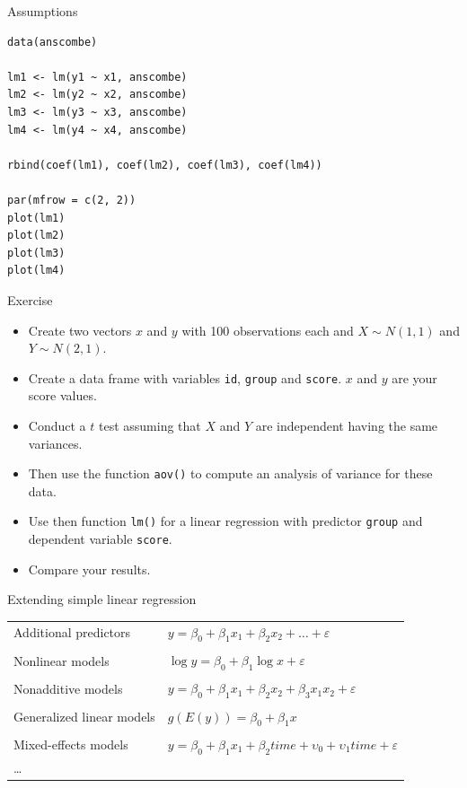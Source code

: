 \documentclass[aspectratio=169]{beamer}
\begin{document}
\begin{frame}[fragile]{Assumptions}
\begin{lstlisting}
data(anscombe)

lm1 <- lm(y1 ~ x1, anscombe)
lm2 <- lm(y2 ~ x2, anscombe)
lm3 <- lm(y3 ~ x3, anscombe)
lm4 <- lm(y4 ~ x4, anscombe)

rbind(coef(lm1), coef(lm2), coef(lm3), coef(lm4))

par(mfrow = c(2, 2))
plot(lm1)
plot(lm2)
plot(lm3)
plot(lm4)
\end{lstlisting}
\end{frame}

\begin{frame}{}
  \begin{block}{Exercise}
    \begin{itemize}
      \item Create two vectors $x$ and $y$ with 100 observations each and
        $X \sim N(1,1)$ and $Y \sim N(2,1)$.
      \item Create a data frame with variables \texttt{id}, \texttt{group}
        and \texttt{score}. $x$ and $y$ are your score values.
      \item Conduct a $t$ test assuming that $X$ and $Y$ are independent
        having the same variances.
      \item Then use the function \texttt{aov()} to compute an analysis of
        variance for these data.
      \item Use then function \texttt{lm()} for a linear regression with
        predictor \texttt{group} and dependent variable \texttt{score}.
      \item Compare your results.
    \end{itemize}
  \end{block}
\end{frame}

\begin{frame}{Extending simple linear regression}
  \begin{tabular}{ll}
    Additional predictors &
      $y = \beta_0 + \beta_1 x_1 + \beta_2 x_2 + \dots +
      \varepsilon$\\
      & \\
    Nonlinear models &
      $\log y = \beta_0 + \beta_1 \log x + \varepsilon$\\
      & \\
    Nonadditive models &
      $y = \beta_0 + \beta_1 x_1 + \beta_2 x_2 + \beta_3
      x_1 x_2 + \varepsilon$\\
      & \\
    Generalized linear models &
      $g(E(y)) = \beta_0 + \beta_1 x$\\
      & \\
    Mixed-effects models &
      $y = \beta_0 + \beta_1 x_1 + \beta_2 time + 
      \upsilon_0 + \upsilon_1 time + \varepsilon$\\
      \dots & \\
  \end{tabular}
\end{frame}
\end{document}
